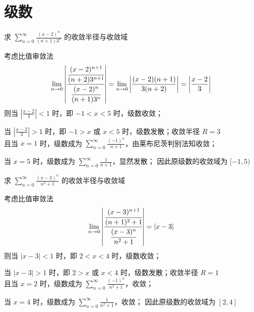 \documentclass[color=green,titlestyle=hang]{elegantbook}%
\begin{document}



\chapter{级数}
\begin{example}
求 $\sum_{n=0}^{\infty}\frac{(x-2)^n}{(n+1)3^n}$ 的收敛半径与收敛域	
\end{example}\begin{Solution}考虑比值审敛法
\[\lim_{n\to0}\left|\cfrac{\cfrac{(x-2)^{n+1}}{(n+2)3^{n+1}}}{\cfrac{(x-2)^n}{(n+1)3^n}}\right|=\lim_{n\to0}\left|\frac{(x-2)(n+1)}{3(n+2)}\right|=\left|\frac{x-2}{3}\right|\]
则当 $\left|\frac{x-2}{3}\right|<1$ 时，即 $-1<x<5$ 时，级数收敛；\\
\par\setlength{\parindent}{1em}当 $\left|\frac{x-2}{3}\right|>1$ 时，即 $-1>x$ 或 $x<5$ 时，级数发散；{\color{red}收敛半径 $R=3$}\\
且当  $x=1$ 时，级数成为 $\sum_{n=0}^{\infty}\frac{(-1)^n}{n+1}$，由莱布尼茨判别法知收敛；\\
\par 当  $x=5$ 时，级数成为 $\sum_{n=0}^{\infty}\frac{1}{n+1}$，显然发散；
因此原级数的{\color{red}收敛域为 $[-1,5)$}	
\end{Solution}

\begin{example}
求 $\sum_{n=0}^{\infty}\frac{(x-3)^n}{n^2+1}$ 的收敛半径与收敛域	
\end{example}\begin{Solution}考虑比值审敛法
\[\lim_{n\to0}\left|\cfrac{\cfrac{(x-3)^{n+1}}{(n+1)^2+1}}{\cfrac{(x-3)^n}{n^2+1}}\right|=|x-3|\]
则当 $|x-3|<1$ 时，即 $2<x<4$ 时，级数收敛；
\par\setlength{\parindent}{1em}当 $\left|x-3\right|>1$ 时，即 $2>x$ 或 $x<4$ 时，级数发散；{\color{red}收敛半径 $R=1$}\\
且当  $x=2$ 时，级数成为 $\sum_{n=0}^{\infty}\frac{(-1)^n}{n^2+1}$，收敛；\\
\par 当  $x=4$ 时，级数成为 $\sum_{n=0}^{\infty}\frac{1}{n^2+1}$，收敛；
因此原级数的{\color{red}收敛域为 $[2,4]$}	
\end{Solution}
\end{document}
